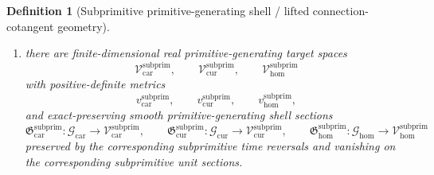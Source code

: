 \documentclass[11pt]{article}
\newcommand{\TensorSubprimitiveSpace}{\mathcal G_{\mathrm{car}}}
\newcommand{\CurSubprimitiveSpace}{\mathcal G_{\mathrm{cur}}}
\newcommand{\HomSubprimitiveSpace}{\mathcal G_{\mathrm{hom}}}
\newcommand{\TensorSubprimitiveRead}{\Pi_{\mathrm{car}}^{\mathrm{subprim}}}
\newcommand{\CurSubprimitiveRead}{\Pi_{\mathrm{cur}}^{\mathrm{subprim}}}
\newcommand{\HomSubprimitiveRead}{\Pi_{\mathrm{hom}}^{\mathrm{subprim}}}
\newcommand{\TensorSubprimitiveTarget}{\mathcal V_{\mathrm{car}}^{\mathrm{subprim}}}
\newcommand{\CurSubprimitiveTarget}{\mathcal V_{\mathrm{cur}}^{\mathrm{subprim}}}
\newcommand{\HomSubprimitiveTarget}{\mathcal V_{\mathrm{hom}}^{\mathrm{subprim}}}
\newcommand{\TensorSubprimitiveTargetMetric}{v_{\mathrm{car}}^{\mathrm{subprim}}}
\newcommand{\CurSubprimitiveTargetMetric}{v_{\mathrm{cur}}^{\mathrm{subprim}}}
\newcommand{\HomSubprimitiveTargetMetric}{v_{\mathrm{hom}}^{\mathrm{subprim}}}
\newcommand{\TensorSubprimitiveSection}{\mathfrak G_{\mathrm{car}}^{\mathrm{subprim}}}
\newcommand{\CurSubprimitiveSection}{\mathfrak G_{\mathrm{cur}}^{\mathrm{subprim}}}
\newcommand{\HomSubprimitiveSection}{\mathfrak G_{\mathrm{hom}}^{\mathrm{subprim}}}
\newtheorem{definition}{Definition}
\begin{document}
\begin{definition}[Subprimitive primitive-generating shell / lifted connection-cotangent geometry]
\begin{enumerate}
    \[
    (\TensorSubprimitiveRead)^{-1}(x),\qquad
    (\CurSubprimitiveRead)^{-1}(y),\qquad
    (\HomSubprimitiveRead)^{-1}(z)
    \]
    is compact.
    \item there are finite-dimensional real primitive-generating target spaces
    \[
    \TensorSubprimitiveTarget,\qquad
    \CurSubprimitiveTarget,\qquad
    \HomSubprimitiveTarget
    \]
    with positive-definite metrics
    \[
    \TensorSubprimitiveTargetMetric,\qquad
    \CurSubprimitiveTargetMetric,\qquad
    \HomSubprimitiveTargetMetric,
    \]
    and exact-preserving smooth primitive-generating shell sections
    \[
    \TensorSubprimitiveSection:\TensorSubprimitiveSpace\to\TensorSubprimitiveTarget,\qquad
    \CurSubprimitiveSection:\CurSubprimitiveSpace\to\CurSubprimitiveTarget,\qquad
    \HomSubprimitiveSection:\HomSubprimitiveSpace\to\HomSubprimitiveTarget
    \]
    preserved by the corresponding subprimitive time reversals and vanishing on the corresponding subprimitive unit sections.


\end{enumerate}
\end{definition}
\end{document}
